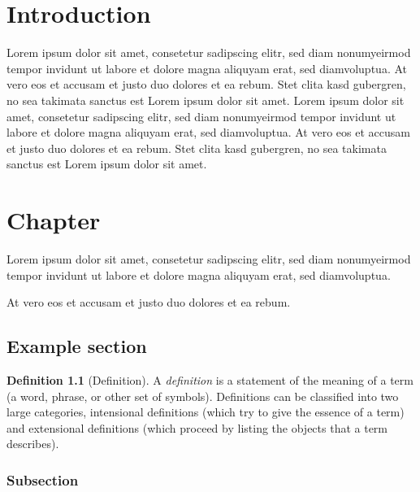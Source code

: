 \documentclass[a4paper,11pt,twoside]{report}
\theoremstyle{definition}
\newtheorem{definition}[theorem]{Definition}
\begin{document}
\tableofcontents
\thispagestyle{empty}
\newpage




\null\thispagestyle{empty}\newpage
\setcounter{page}{9}
\pagestyle{fancy}


\chapter*{Introduction} %


Lorem ipsum dolor sit amet, consetetur sadipscing elitr, sed diam nonumyeirmod tempor invidunt ut labore et dolore magna aliquyam erat, sed diamvoluptua. At vero eos et accusam et justo duo dolores et ea rebum. Stet clita kasd gubergren, no sea takimata sanctus est Lorem ipsum dolor sit amet. Lorem ipsum dolor sit amet, consetetur sadipscing elitr, sed diam nonumyeirmod tempor invidunt ut labore et dolore magna aliquyam erat, sed diamvoluptua. At vero eos et accusam et justo duo dolores et ea rebum. Stet clita kasd gubergren, no sea takimata sanctus est Lorem ipsum dolor sit amet.

\chapter{Chapter}


Lorem ipsum dolor sit amet, consetetur sadipscing elitr, sed diam nonumyeirmod tempor invidunt ut labore et dolore magna aliquyam erat, sed diamvoluptua.

At vero eos et accusam et justo duo dolores et ea rebum.


\section{Example section}

\begin{definition}[Definition]
A \emph{definition} is a statement of the meaning of a term (a word, phrase, or other set of symbols). Definitions can be classified into two large categories, intensional definitions (which try to give the essence of a term) and extensional definitions (which proceed by listing the objects that a term describes).
\end{definition}

\subsection{Subsection}
\end{document}
